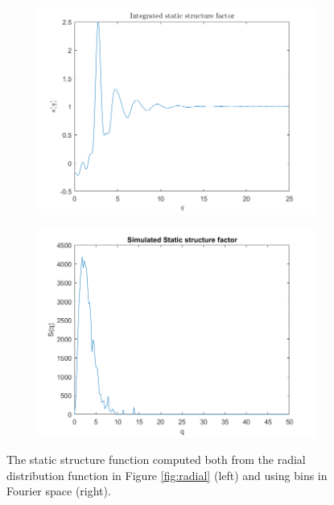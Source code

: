 \begin{figure}[H]
    \centering
    \captionsetup[subfigure]{justification=centering}
    \begin{subfigure}[b]{0.40\textwidth}
        \centering
        \includegraphics[width=\textwidth]{graphics/task8/integral.png}
    \end{subfigure}
    \begin{subfigure}[b]{0.40\textwidth}
        \centering
        \includegraphics[width=\textwidth]{graphics/task8/simulated.png}
    \end{subfigure}
    \caption{The static structure function computed both from the radial distribution function in Figure \ref{fig:radial} (left) and using bins in Fourier space (right).}
    \label{fig:StaticStructure}
\end{figure}


